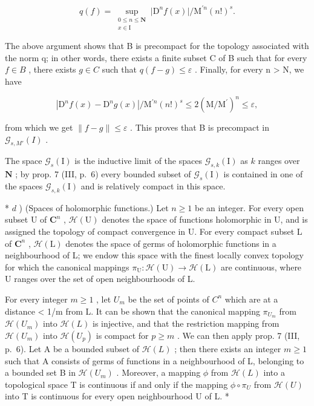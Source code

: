 \[
q(f) = \sup_{\substack{0\leqslant n\leqslant \mathbf{N}\\ x\in \mathrm{I}}}\big|\mathrm{D}^{n}f(x)\big| / \mathrm{M}^{\prime n}(n!)^{s}  .
\]

The above argument shows that B is precompact for the topology associated with the norm q; in other words, there exists a finite subset C of B such that for every \(f \in B\) , there exists \(g \in C\) such that \(q(f - g) \leqslant \varepsilon\) . Finally, for every n \textgreater{} N, we have

\[
\left| \mathrm{D} ^ {n} f (x) - \mathrm{D} ^ {n} g (x) \right| / \mathrm{M} ^ {\prime n} (n!) ^ {s} \leqslant 2 (\mathrm{M} / \mathrm{M} ^ {\prime}) ^ {n} \leqslant \varepsilon ,
\]

from which we get \(\| f - g\| \leqslant \varepsilon\) . This proves that B is precompact in \(\mathcal{G}_{s,M'}(I)\) .

The space \(\mathcal{G}_s(\mathrm{I})\) is the inductive limit of the spaces \(\mathcal{G}_{s,k}(\mathrm{I})\) as \(k\) ranges over \(\mathbf{N}\) ; by prop. 7 (III, p.~6) every bounded subset of \(\mathcal{G}_s(\mathrm{I})\) is contained in one of the spaces \(\mathcal{G}_{s,k}(\mathrm{I})\) and is relatively compact in this space.

* \(d\) ) (Spaces of holomorphic functions.) Let \(n \geqslant 1\) be an integer. For every open subset U of \(\mathbf{C}^n\) , \(\mathcal{H}(\mathrm{U})\) denotes the space of functions holomorphic in U, and is assigned the topology of compact convergence in U. For every compact subset L of \(\mathbf{C}^n\) , \(\mathcal{H}(\mathrm{L})\) denotes the space of germs of holomorphic functions in a neighbourhood of L; we endow this space with the finest locally convex topology for which the canonical mappings \(\pi_{\mathrm{U}}:\mathcal{H}(\mathrm{U})\to\mathcal{H}(\mathrm{L})\) are continuous, where U ranges over the set of open neighbourhoods of L.

For every integer \(m \geqslant 1\) , let \(U_{m}\) be the set of points of \(C^{n}\) which are at a distance \textless{} 1/m from L. It can be shown that the canonical mapping \(\pi_{U_{m}}\) from \(\mathcal{H}(U_{m})\) into \(\mathcal{H}(L)\) is injective, and that the restriction mapping from \(\mathcal{H}(U_{m})\) into \(\mathcal{H}(U_{p})\) is compact for \(p \geqslant m\) . We can then apply prop. 7 (III, p.~6). Let A be a bounded subset of \(\mathcal{H}(L)\) ; then there exists an integer \(m \geqslant 1\) such that A consists of germs of functions in a neighbourhood of L, belonging to a bounded set B in \(\mathcal{H}(U_{m})\) . Moreover, a mapping \(\phi\) from \(\mathcal{H}(L)\) into a topological space T is continuous if and only if the mapping \(\phi \circ \pi_{U}\) from \(\mathcal{H}(U)\) into T is continuous for every open neighbourhood U of L. *

